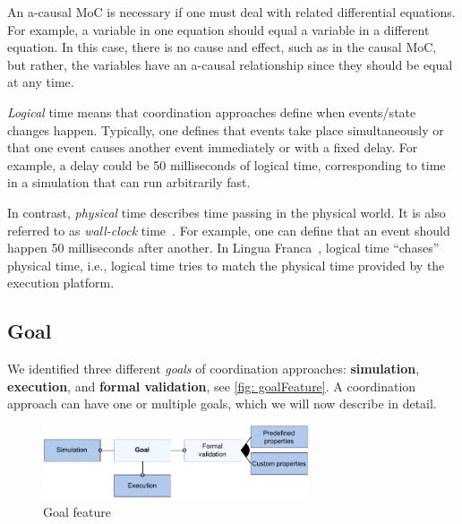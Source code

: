 \documentclass[runningheads]{llncs}
\begin{document}
An a-causal MoC is necessary if one must deal with related differential equations.
For example, a variable in one equation should equal a variable in a different equation.
In this case, there is no cause and effect, such as in the causal MoC, but rather, the variables have an a-causal relationship since they should be equal at any time.

\textit{Logical} time means that coordination approaches define when events/state changes happen.
Typically, one defines that events take place simultaneously or that one event causes another event immediately or with a fixed delay.
For example, a delay could be 50 milliseconds of logical time, corresponding to time in a simulation that can run arbitrarily fast.

In contrast, \textit{physical} time describes time passing in the physical world.
It is also referred to as \textit{wall-clock} time~\cite{gomesCoSimulationSurvey2019}.
For example, one can define that an event should happen 50 milliseconds after another.
In Lingua Franca~\cite{lohstrohReactorsDeterministicModel2020}, logical time ``chases'' physical time, i.e., logical time tries to match the physical time provided by the execution platform.


\subsection{Goal} %
We identified three different \textit{goals} of coordination approaches: \textbf{simulation}, \textbf{execution}, and \textbf{formal validation}, see \autoref{fig: goalFeature}.
A coordination approach can have one or multiple goals, which we will now describe in detail.

\begin{figure}[ht]
	\centering
	\includegraphics[width=0.7\textwidth]{images/goal_feature}
	\caption{Goal feature}
	\label{fig: goalFeature}
\end{figure}
\end{document}
